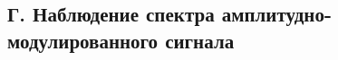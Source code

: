 \documentclass[a4paper,12pt]{article}
\begin{document}





\subsection*{Г. Наблюдение спектра амплитудно-модулированного сигнала}
\end{document}
